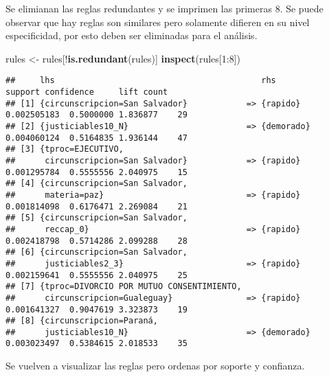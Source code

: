 \documentclass[runningheads,a4paper]{llncs}
\newenvironment{Shaded}{\footnotesize}{}
\newcommand{\KeywordTok}[1]{\textcolor[rgb]{0.00,0.44,0.13}{\textbf{{#1}}}}
\newcommand{\DecValTok}[1]{\textcolor[rgb]{0.25,0.63,0.44}{{#1}}}
\newcommand{\StringTok}[1]{\textcolor[rgb]{0.25,0.44,0.63}{{#1}}}
\newcommand{\NormalTok}[1]{{#1}}
\newcommand{\OperatorTok}[1]{\textcolor[rgb]{0.40,0.40,0.40}{{#1}}}
\begin{document}
\normalsize

Se elimianan las reglas redundantes y se imprimen las primeras 8. Se
puede observar que hay reglas son similares pero solamente difieren en
su nivel especificidad, por esto deben ser eliminadas para el análisis.
\scriptsize

\begin{Shaded}
\begin{Highlighting}[]
\NormalTok{rules <-}\StringTok{ }\NormalTok{rules[}\OperatorTok{!}\KeywordTok{is.redundant}\NormalTok{(rules)]}
\KeywordTok{inspect}\NormalTok{(rules[}\DecValTok{1}\OperatorTok{:}\DecValTok{8}\NormalTok{])}
\end{Highlighting}
\end{Shaded}

\begin{verbatim}
##     lhs                                          rhs            support confidence     lift count
## [1] {circunscripcion=San Salvador}            => {rapido}   0.002505183  0.5000000 1.836877    29
## [2] {justiciables10_N}                        => {demorado} 0.004060124  0.5164835 1.936144    47
## [3] {tproc=EJECUTIVO,                                                                            
##      circunscripcion=San Salvador}            => {rapido}   0.001295784  0.5555556 2.040975    15
## [4] {circunscripcion=San Salvador,                                                               
##      materia=paz}                             => {rapido}   0.001814098  0.6176471 2.269084    21
## [5] {circunscripcion=San Salvador,                                                               
##      reccap_0}                                => {rapido}   0.002418798  0.5714286 2.099288    28
## [6] {circunscripcion=San Salvador,                                                               
##      justiciables2_3}                         => {rapido}   0.002159641  0.5555556 2.040975    25
## [7] {tproc=DIVORCIO POR MUTUO CONSENTIMIENTO,                                                    
##      circunscripcion=Gualeguay}               => {rapido}   0.001641327  0.9047619 3.323873    19
## [8] {circunscripcion=Paraná,                                                                     
##      justiciables10_N}                        => {demorado} 0.003023497  0.5384615 2.018533    35
\end{verbatim}

\normalsize

Se vuelven a visualizar las reglas pero ordenas por soporte y confianza.
\end{document}
